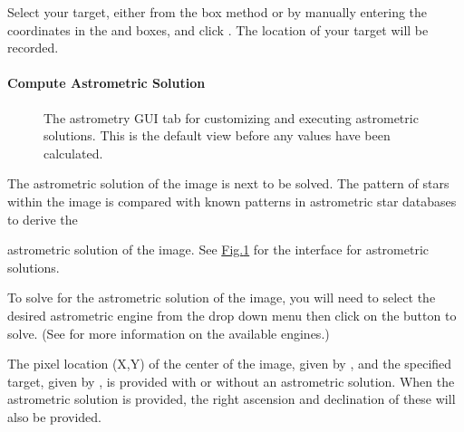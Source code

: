 \documentclass[letterpaper,11pt,english]{sphinxmanual}
\begin{document}
\sphinxAtStartPar
Select your target, either from the box method or by manually entering the
coordinates in the  and  boxes, and
click . The location of your target will be recorded.


\paragraph{Compute Astrometric Solution}
\label{\detokenize{user/manual_mode:compute-astrometric-solution}}\label{\detokenize{user/manual_mode:user-manual-mode-procedure-find-asteroid-location-compute-astrometric-solution}}
\begin{figure}[H]
\centering
\capstart

\noindent{}
\caption{The astrometry GUI tab for customizing and executing astrometric solutions.
This is the default view before any values have been calculated.}\label{\detokenize{user/manual_mode:id5}}\label{\detokenize{user/manual_mode:figure-manual-mode-gui-astrometry}}\end{figure}

\sphinxAtStartPar
The astrometric solution of the image is next to be solved. The pattern of
stars within the image is compared with known patterns in astrometric star
databases to derive the %
\begin{footnote}[6]\sphinxAtStartFootnote
{}
%
\end{footnote}
astrometric solution of the image. See \hyperref[\detokenize{user/manual_mode:figure-manual-mode-gui-astrometry}]{Fig.\@ \ref{\detokenize{user/manual_mode:figure-manual-mode-gui-astrometry}}}
for the interface for astrometric solutions.

\sphinxAtStartPar
To solve for the astrometric solution of the image, you will need to select
the desired astrometric engine from the drop down menu then click on the
 button to solve.
(See {\hyperref[\detokenize{technical/architecture/services_engines:technical-architecture-services-engines}]{}} for more information on
the available engines.)

\sphinxAtStartPar
The pixel location (X,Y) of the center of the image, given by
, and the specified target, given by
, is provided with or without an astrometric
solution. When the astrometric solution is provided, the right ascension and
declination of these will also be provided.
\end{document}
